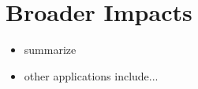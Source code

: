 \section{Broader Impacts}

\begin{itemize}
\item summarize
\item other applications include...
\end{itemize}
